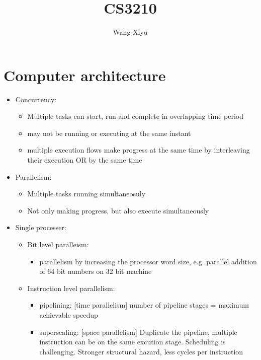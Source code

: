 \documentclass{article}
\begin{document}
\title{CS3210}
\author{
  Wang Xiyu
}
\maketitle
\section{Computer architecture}
\begin{itemize}
    \item Concurrency:
    \begin{itemize}
        \item Multiple tasks can start, run and complete in overlapping time period
        \item may not be running or executing at the same instant
        \item multiple execution flows make progress at the same time by interleaving their execution OR by the same time
    \end{itemize} 
    \item Parallelism:
    \begin{itemize}
        \item Multiple tasks running simultaneosuly
        \item Not only making progress, but also execute simultaneously
    \end{itemize}
\end{itemize}

\begin{itemize}
    \item Single processer:
    \begin{itemize}
        \item Bit level paralleism:
        \begin{itemize}
            \item parallelism by increasing the processor word size, e.g. parallel addition of 64 bit numbers on 32 bit machine
        \end{itemize}
        \item Instruction level parallelism:
        \begin{itemize}
            \item pipelining: [time parallelism] number of pipeline stages = maximum achievable speedup
            \item superscaling: [space parallelism] Duplicate the pipeline, multiple instruction can be on the same excution stage. Scheduling is challenging. Stronger structural hazard, less cycles per instruction
        \end{itemize}
    \end{itemize}
\end{itemize}
\end{document}
